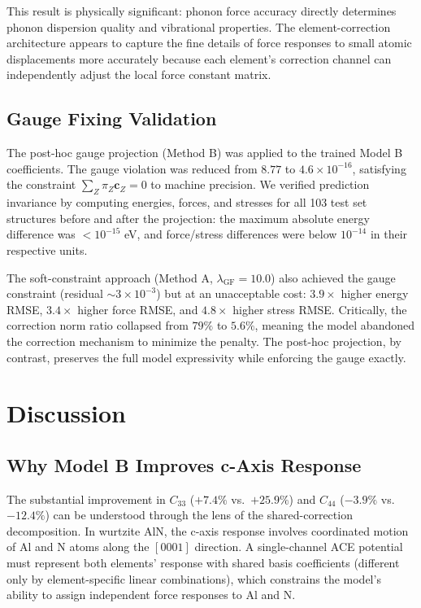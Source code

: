 \documentclass[twoside,prb,aps,floatfix,superscriptaddress,longbibliography]{revtex4-2}
\begin{document}
This result is physically significant: phonon force accuracy directly determines phonon dispersion quality and vibrational properties. The element-correction architecture appears to capture the fine details of force responses to small atomic displacements more accurately because each element's correction channel can independently adjust the local force constant matrix.

\subsection{Gauge Fixing Validation}
\label{sec:gauge_results}

The post-hoc gauge projection (Method B) was applied to the trained Model B coefficients. The gauge violation was reduced from $8.77$ to $4.6 \times 10^{-16}$, satisfying the constraint $\sum_Z \pi_Z \mathbf{c}_Z = 0$ to machine precision. We verified prediction invariance by computing energies, forces, and stresses for all 103 test set structures before and after the projection: the maximum absolute energy difference was $< 10^{-15}$ eV, and force/stress differences were below $10^{-14}$ in their respective units.

The soft-constraint approach (Method A, $\lambda_{\mathrm{GF}} = 10.0$) also achieved the gauge constraint (residual $\sim 3 \times 10^{-3}$) but at an unacceptable cost: $3.9\times$ higher energy RMSE, $3.4\times$ higher force RMSE, and $4.8\times$ higher stress RMSE. Critically, the correction norm ratio collapsed from $79\%$ to $5.6\%$, meaning the model abandoned the correction mechanism to minimize the penalty. The post-hoc projection, by contrast, preserves the full model expressivity while enforcing the gauge exactly.

\section{Discussion}
\label{sec:discussion}

\subsection{Why Model B Improves c-Axis Response}

The substantial improvement in $C_{33}$ ($+7.4\%$ vs.\ $+25.9\%$) and $C_{44}$ ($-3.9\%$ vs.\ $-12.4\%$) can be understood through the lens of the shared-correction decomposition. In wurtzite AlN, the c-axis response involves coordinated motion of Al and N atoms along the $[0001]$ direction. A single-channel ACE potential must represent both elements' response with shared basis coefficients (different only by element-specific linear combinations), which constrains the model's ability to assign independent force responses to Al and N.
\end{document}
